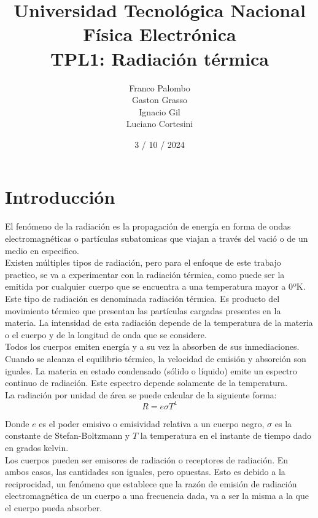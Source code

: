 \documentclass[a4paper,12pt]{report}
\title{%
  \fontsize{25}{0}\selectfont Universidad Tecnológica Nacional \\
  \fontsize{22}{30}\selectfont Física Electrónica \\
  \fontsize{18}{25}\selectfont TPL1: Radiación térmica
}
\author{
Franco Palombo\\
Gaston Grasso\\
Ignacio Gil\\
Luciano Cortesini\\
}
\date{3 / 10 / 2024}
\begin{document}
\maketitle

\chapter{Introducción}
  El fenómeno de la radiación es la propagación de energía en forma de ondas electromagnéticas o partículas subatomicas
  que viajan a través del vació o de un medio en especifico.\\

  Existen múltiples tipos de radiación, pero para el enfoque de este trabajo practico, se va a experimentar con la
  radiación térmica, como puede ser la emitida por cualquier cuerpo que se encuentra a una temperatura mayor a 0ºK.
  Este tipo de radiación es denominada radiación térmica. Es producto del movimiento térmico que presentan las
  partículas cargadas presentes en la materia. La intensidad de esta radiación depende de la temperatura de la materia
  o el cuerpo y de la longitud de onda que se considere.\\

  Todos los cuerpos emiten energía y a su vez la absorben de sus inmediaciones. Cuando se alcanza el equilibrio térmico,
  la velocidad de emisión y absorción son iguales. La materia en estado condensado (sólido o líquido) emite un espectro
  continuo de radiación. Este espectro depende solamente de la temperatura.\\

  La radiación por unidad de área se puede calcular de la siguiente forma:
  \begin{equation}
    R = e \sigma T^4
  \end{equation}

  Donde $e$ es el poder emisivo o emisividad relativa a un cuerpo negro, $\sigma$ es la constante de Stefan-Boltzmann y
  $T$ la temperatura en el instante de tiempo dado en grados kelvin.\\

  Los cuerpos pueden ser emisores de radiación o receptores de radiación. En ambos casos, las cantidades son iguales,
  pero opuestas. Esto es debido a la reciprocidad, un fenómeno que establece que la razón de emisión de radiación
  electromagnética de un cuerpo a una frecuencia dada, va a ser la misma a la que el cuerpo pueda absorber.\\
\end{document}
